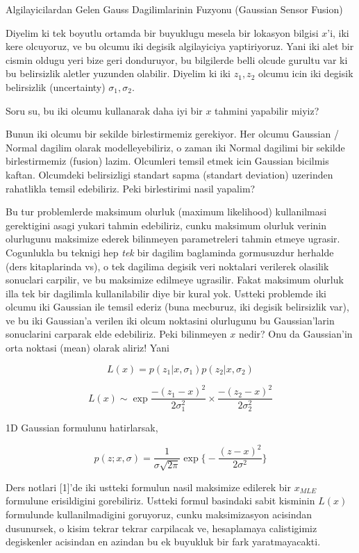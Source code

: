 \documentclass[12pt,fleqn]{article}\usepackage{../common}
\begin{document}
Algilayicilardan Gelen Gauss Dagilimlarinin Fuzyonu (Gaussian Sensor Fusion)

Diyelim ki tek boyutlu ortamda bir buyuklugu mesela bir lokasyon bilgisi
$x$'i, iki kere olcuyoruz, ve bu olcumu iki degisik algilayiciya
yaptiriyoruz. Yani iki alet bir cismin oldugu yeri bize geri donduruyor, bu
bilgilerde belli olcude gurultu var ki bu belirsizlik aletler yuzunden
olabilir. Diyelim ki iki $z_1,z_2$ olcumu icin iki degisik belirsizlik
(uncertainty) $\sigma_1,\sigma_2$. 

Soru su, bu iki olcumu kullanarak daha iyi bir $x$ tahmini yapabilir miyiz?

Bunun iki olcumu bir sekilde birlestirmemiz gerekiyor. Her olcumu Gaussian
/ Normal dagilim olarak modelleyebiliriz, o zaman iki Normal dagilimi bir
sekilde birlestirmemiz (fusion) lazim. Olcumleri temsil etmek icin Gaussian
bicilmis kaftan. Olcumdeki belirsizligi standart sapma (standart deviation)
uzerinden rahatlikla temsil edebiliriz. Peki birlestirimi nasil yapalim? 

Bu tur problemlerde maksimum olurluk (maximum likelihood) kullanilmasi
gerektigini asagi yukari tahmin edebiliriz, cunku maksimum olurluk verinin
olurlugunu maksimize ederek bilinmeyen parametreleri tahmin etmeye
ugrasir. Cogunlukla bu teknigi hep {\em tek} bir dagilim baglaminda
gormusuzdur herhalde (ders kitaplarinda vs), o tek dagilima degisik veri
noktalari verilerek olasilik sonuclari carpilir, ve bu maksimize edilmeye
ugrasilir. Fakat maksimum olurluk illa tek bir dagilimla kullanilabilir
diye bir kural yok. Ustteki problemde iki olcumu iki Gaussian ile temsil
ederiz (buna mecburuz, iki degisik belirsizlik var), ve bu iki Gaussian'a
verilen iki olcum noktasini olurlugunu bu Gaussian'larin sonuclarini
carparak elde edebiliriz. Peki bilinmeyen $x$ nedir? Onu da Gaussian'in
orta noktasi (mean) olarak aliriz! Yani

$$ L(x) = p(z_1|x,\sigma_1) p(z_2|x,\sigma_2) $$

$$ L(x) \sim \exp{\frac{-(z_1-x)^2}{2\sigma_1^2} } 
\times \frac{-(z_2-x)^2}{2\sigma_2^2} $$

1D Gaussian formulunu hatirlarsak, 

$$ p(z;x,\sigma) = \frac{1}{\sigma\sqrt{2\pi}} 
\exp \bigg\{ - \frac{(z-x)^2}{2\sigma^2}  \bigg\}
 $$

Ders notlari [1]'de iki ustteki formulun nasil maksimize edilerek bir
$x_{MLE}$ formulune erisildigini gorebiliriz. Ustteki formul basindaki
sabit kisminin $L(x)$ formulunde kullanilmadigini goruyoruz, cunku
maksimizasyon acisindan dusunursek, o kisim tekrar tekrar carpilacak ve,
hesaplamaya calistigimiz degiskenler acisindan en azindan bu ek buyukluk
bir fark yaratmayacakti.
\end{document}
